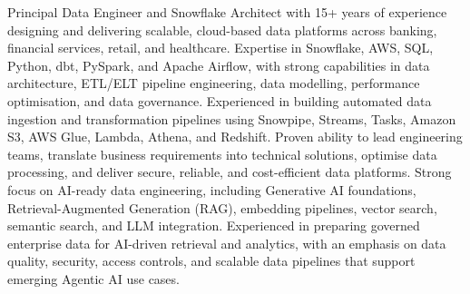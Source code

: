

\begin{cvparagraph}

Principal Data Engineer and Snowflake Architect with 15+ years of experience designing and delivering scalable, cloud-based data platforms across banking, financial services, retail, and healthcare. Expertise in Snowflake, AWS, SQL, Python, dbt, PySpark, and Apache Airflow, with strong capabilities in data architecture, ETL/ELT pipeline engineering, data modelling, performance optimisation, and data governance.
Experienced in building automated data ingestion and transformation pipelines using Snowpipe, Streams, Tasks, Amazon S3, AWS Glue, Lambda, Athena, and Redshift. Proven ability to lead engineering teams, translate business requirements into technical solutions, optimise data processing, and deliver secure, reliable, and cost-efficient data platforms.
Strong focus on AI-ready data engineering, including Generative AI foundations, Retrieval-Augmented Generation (RAG), embedding pipelines, vector search, semantic search, and LLM integration. Experienced in preparing governed enterprise data for AI-driven retrieval and analytics, with an emphasis on data quality, security, access controls, and scalable data pipelines that support emerging Agentic AI use cases.
\end{cvparagraph}
